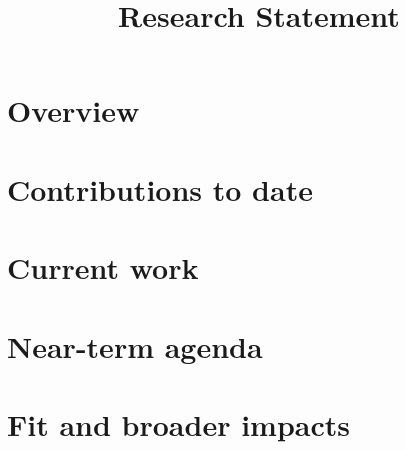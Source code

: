 \documentclass[11pt,letterpaper]{article}
\title{Research Statement}
\author{\docauthor}
\date{}
\begin{document}
\maketitle
\thispagestyle{empty}


\section*{Overview}

\section*{Contributions to date}

\section*{Current work}

\section*{Near-term agenda}

\section*{Fit and broader impacts}

\end{document}
